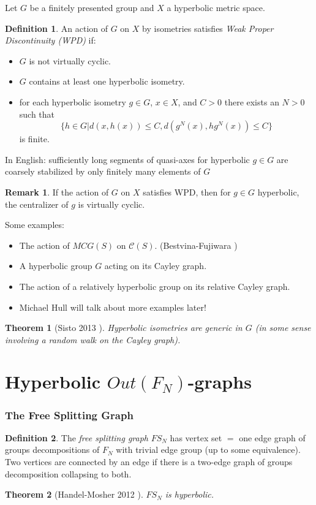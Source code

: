 \documentclass{beamer}
\theoremstyle{theorem}
\newtheorem{thm}{Theorem}
\theoremstyle{definition}
\newtheorem*{defin}{Definition}
\newtheorem*{remark}{Remark}
\renewcommand{\-}{\ensuremath{^{-1}}}
\renewcommand{\>}{\ensuremath{\rightarrow}}
\renewcommand{\(}{\langle}
\renewcommand{\)}{\rangle}
\begin{document}
\begin{frame}
Let $G$ be a finitely presented group and $X$ a hyperbolic metric space.
\pause
\begin{defin}
An action of $G$ on $X$ by isometries satisfies \emph{Weak Proper Discontinuity (WPD)} if:
\pause
\begin{itemize}
\item $G$ is not virtually cyclic.
\pause
\item $G$ contains at least one hyperbolic isometry.
\pause
\item for each hyperbolic isometry $g \in G$, $x \in X$, and $C >0$ there exists an $N > 0$ such that $$\{ h  \in G | d(x,h(x)) \leq C, d(g^N(x), hg^N(x)) \leq C \}$$ is finite.
\end{itemize}
\end{defin}
\pause
In English: sufficiently long segments of quasi-axes for hyperbolic $g \in G$ are coarsely stabilized by only finitely many elements of $G$
\end{frame}

\begin{frame}
\begin{remark}
If the action of $G$ on $X$ satisfies WPD, then for $g \in G$ hyperbolic, the centralizer of $g$ is virtually cyclic.
\end{remark}
\pause
Some examples:
\pause
\begin{itemize}
\item The action of $MCG(S)$ on $\mathcal{C}(S)$. (Bestvina-Fujiwara \cite{BF02})
\pause
\item A hyperbolic group $G$ acting on its Cayley graph.
\pause
\item The action of a relatively hyperbolic group on its relative Cayley graph.
\pause
\item Michael Hull will talk about more examples later!
\end{itemize}
\pause
\begin{thm}[Sisto 2013 \cite{Sisto13}]
Hyperbolic isometries are generic in $G$ (in some sense involving a random walk on the Cayley graph).
\end{thm}
\end{frame}

\section{Hyperbolic $Out(F_N)$-graphs}

\begin{frame}
\frametitle{The Free Splitting Graph}
\begin{defin}
The \emph{free splitting graph} $FS_N$ has vertex set $=$ one edge graph of groups decompositions of $F_N$ with trivial edge group (up to some equivalence). Two vertices are connected by an edge if there is a two-edge graph of groups decomposition collapsing to both.
\end{defin}
\pause
\begin{thm}[Handel-Mosher 2012 \cite{HandelMosher}]
$FS_N$ is hyperbolic.
\end{thm}
\end{frame}
\end{document}
